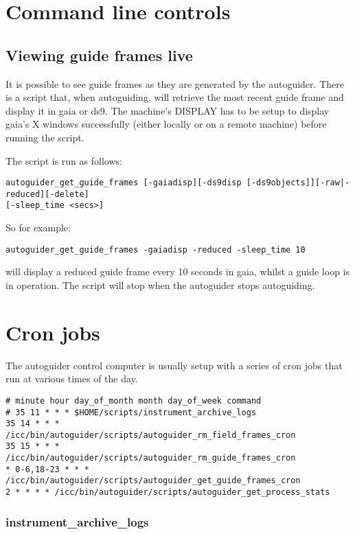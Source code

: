 \documentclass[10pt,a4paper]{article}
\begin{document}
\section{Command line controls}

\subsection{Viewing guide frames live}

It is possible to see guide frames as they are generated by the autoguider. There is a script that, when
autoguiding, will retrieve the most recent guide frame and display it in gaia or ds9. The machine's DISPLAY has to be setup to display gaia's X windows successfully (either locally or on a remote machine) before running the script.

The script is run as follows:
\begin{verbatim}
autoguider_get_guide_frames [-gaiadisp][-ds9disp [-ds9objects]][-raw|-reduced][-delete]
[-sleep_time <secs>]
\end{verbatim}

So for example:
\begin{verbatim}
autoguider_get_guide_frames -gaiadisp -reduced -sleep_time 10
\end{verbatim}
will display a reduced guide frame every 10 seconds in gaia, whilst a guide loop is in operation. The script will stop
when the autoguider stops autoguiding. 

\section{Cron jobs}

The autoguider control computer is usually setup with a series of cron jobs that run at various times of the day.

\begin{verbatim}
# minute hour day_of_month month day_of_week command
# 35 11 * * * $HOME/scripts/instrument_archive_logs
35 14 * * * /icc/bin/autoguider/scripts/autoguider_rm_field_frames_cron
35 15 * * * /icc/bin/autoguider/scripts/autoguider_rm_guide_frames_cron
* 0-6,18-23 * * * /icc/bin/autoguider/scripts/autoguider_get_guide_frames_cron
2 * * * * /icc/bin/autoguider/scripts/autoguider_get_process_stats
\end{verbatim}

\subsubsection{instrument\_archive\_logs}
\end{document}

